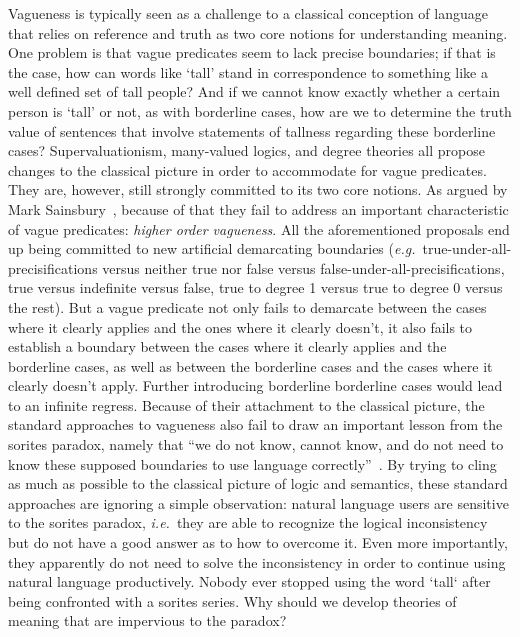 \documentclass[a4paper]{article}
\begin{document}
Vagueness is typically seen as a challenge to a classical conception of language that relies on reference and truth as two core notions for understanding meaning.
One problem is that vague predicates seem to lack precise boundaries; if that is the case, how can words like `tall' stand in correspondence to something like a well defined set of tall people?
And if we cannot know exactly whether a certain person is `tall' or not, as with borderline cases, how are we to determine the truth value of sentences that involve statements of tallness regarding these borderline cases?
Supervaluationism, many-valued logics, and degree theories all propose changes to the classical picture in order to accommodate for vague predicates.
They are, however, still strongly committed to its two core notions.
As argued by Mark Sainsbury~\parencite*{sainsbury_concepts_1999}, because of that they fail to address an important characteristic of vague predicates: \emph{higher order vagueness}.
All the aforementioned proposals end up being committed to new artificial demarcating boundaries (\emph{e.g.}~true-under-all-precisifications versus neither true nor false versus false-under-all-precisifications, true versus indefinite versus false, true to degree 1 versus true to degree 0 versus the rest).
But a vague predicate not only fails to demarcate between the cases where it clearly applies and the ones where it clearly doesn't, it also fails to establish a boundary between the cases where it clearly applies and the borderline cases, as well as between the borderline cases and the cases where it clearly doesn't apply.
Further introducing borderline borderline cases would lead to an infinite regress.
Because of their attachment to the classical picture, the standard approaches to vagueness also fail to draw an important lesson from the sorites paradox, namely that ``we do not know, cannot know, and do not need to know these supposed boundaries to use language correctly''~\parencite*[256]{sainsbury_concepts_1999}.
By trying to cling as much as possible to the classical picture of logic and semantics, these standard approaches are ignoring a simple observation: natural language users are sensitive to the sorites paradox, \emph{i.e.}~they are able to recognize the logical inconsistency but do not have a good answer as to how to overcome it.
Even more importantly, they apparently do not need to solve the inconsistency in order to continue using natural language productively.
Nobody ever stopped using the word `tall` after being confronted with a sorites series.
Why should we develop theories of meaning that are impervious to the paradox?
\end{document}
